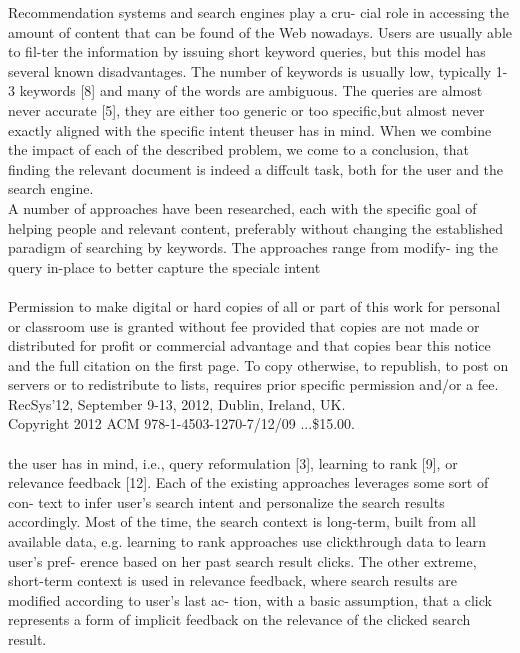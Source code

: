\documentclass{acm_proc_article-sp} %
\begin{document}
Recommendation systems and search engines play a cru-
cial role in accessing the amount of content that can be
found of the Web nowadays. Users are usually able to fil-ter the information by issuing short keyword queries, but
this model has several known disadvantages. The number
of keywords is usually low, typically 1-3 keywords [8] and
many of the words are ambiguous. The queries are almost
never accurate [5], they are either too generic or too specific,but almost never exactly aligned with the specific intent theuser has in mind. When we combine the impact of each of
the described problem, we come to a conclusion, that finding
the relevant document is indeed a diffcult task, both for the
user and the search engine. \\ 
A number of approaches have been researched, each with
the specific goal of helping people and relevant content,
preferably without changing the established paradigm of
searching by keywords. The approaches range from modify-
ing the query in-place to better capture the specialc intent
\\
\\
\small
Permission to make digital or hard copies of all or part of this work for
personal or classroom use is granted without fee provided that copies are
not made or distributed for profit or commercial advantage and that copies
bear this notice and the full citation on the first page. To copy otherwise, to
republish, to post on servers or to redistribute to lists, requires prior specific
permission and/or a fee.\\
RecSys'12, September 9-13, 2012, Dublin, Ireland, UK. \\
Copyright 2012 ACM 978-1-4503-1270-7/12/09 ...\$15.00.
\normalsize
\\
\\
the user has in mind, i.e., query reformulation [3], learning
to rank [9], or relevance feedback [12].
Each of the existing approaches leverages some sort of con-
text to infer user's search intent and personalize the search
results accordingly. Most of the time, the search context
is long-term, built from all available data, e.g. learning to
rank approaches use clickthrough data to learn user's pref-
erence based on her past search result clicks. The other
extreme, short-term context is used in relevance feedback,
where search results are modified according to user's last ac-
tion, with a basic assumption, that a click represents a form
of implicit feedback on the relevance of the clicked search
result.
\\
\end{document}
